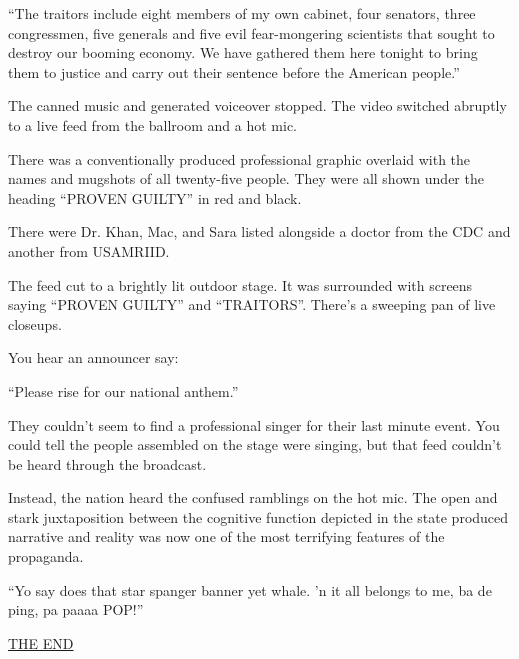 \documentclass[17pt, twoside, a5paper, openright, extrafontsizes]{memoir}
\renewcommand{\emph}[1]{\ul{#1}}
\begin{document}
``The traitors include eight members of my own cabinet, four senators,
three congressmen, five generals and five evil fear-mongering scientists
that sought to destroy our booming economy. We have gathered them here
tonight to bring them to justice and carry out their sentence before the
American people.''

The canned music and generated voiceover stopped. The video switched
abruptly to a live feed from the ballroom and a hot mic.

There was a conventionally produced professional graphic overlaid with
the names and mugshots of all twenty-five people. They were all shown
under the heading ``PROVEN GUILTY'' in red and black.

There were Dr. Khan, Mac, and Sara listed alongside a doctor from the
CDC and another from USAMRIID.

The feed cut to a brightly lit outdoor stage. It was surrounded with
screens saying ``PROVEN GUILTY'' and ``TRAITORS''. There's a sweeping
pan of live closeups.

You hear an announcer say:

``Please rise for our national anthem.''

They couldn't seem to find a professional singer for their last minute
event. You could tell the people assembled on the stage were singing,
but that feed couldn't be heard through the broadcast.

Instead, the nation heard the confused ramblings on the hot mic. The
open and stark juxtaposition between the cognitive function depicted in
the state produced narrative and reality was now one of the most
terrifying features of the propaganda.

``Yo say does that star spanger banner yet whale. 'n it all belongs to
me, ba de ping, pa paaaa POP!''

\emph{THE END}
\end{document}

